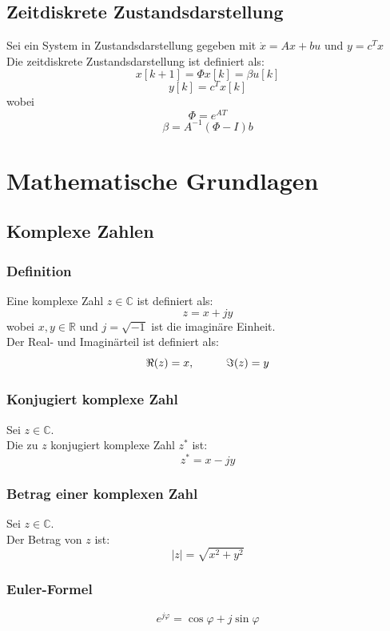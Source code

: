 \documentclass[10pt,a4paper]{article}
\newcommand{\tab}[1][1]{\hspace*{#1cm}}
\begin{document}
\subsection{Zeitdiskrete Zustandsdarstellung}
Sei ein System in Zustandsdarstellung gegeben mit $\dot x = Ax + bu$ und $y = c^T x$ \\
Die zeitdiskrete Zustandsdarstellung ist definiert als:
$$
	x[k+1] = \Phi x[k] = \beta u[k]
$$
$$
	y[k] = c^T x[k]
$$
wobei
$$
	\Phi = e^{AT}
$$
$$
	\beta = A^{-1}(\Phi - I) b
$$












\appendix

\pagebreak
\section{Mathematische Grundlagen}
\subsection{Komplexe Zahlen}
\subsubsection{Definition}
Eine komplexe Zahl $z \in \mathbb{C}$ ist definiert als:
$$
	z = x + jy
$$
wobei $x, y \in \mathbb{R}$ und
$j = \sqrt{-1}$ ist die imaginäre Einheit. \\

Der Real- und Imaginärteil ist definiert als:
$$
	\Re(z) = x, \tab 	\Im(z) = y
$$

\subsubsection{Konjugiert komplexe Zahl}
Sei $z \in \mathbb{C}$. \\
Die zu $z$ konjugiert komplexe Zahl $z^*$ ist:
$$
	z^* = x - jy
$$

\subsubsection{Betrag einer komplexen Zahl}
Sei $z \in \mathbb{C}$. \\
Der Betrag von $z$ ist:
$$
	|z| = \sqrt{x^2 + y^2}
$$

\subsubsection{Euler-Formel}
$$
e^{j\varphi} = \cos \varphi + j \sin \varphi
$$
\end{document}
